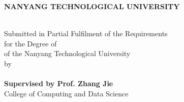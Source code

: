 \makeatletter
\begin{titlepage}
\begin{center}

\uppercase{\textbf{\large{Nanyang Technological University}}}
\\[5cm] %

\uppercase{\textbf{\fypcode \\[0.3cm]\@title}}

\vfill

Submitted in Partial Fulfilment of the Requirements\\
for the Degree of \degree\\
of the Nanyang Technological University
\\[0.8cm]
by
\\[0.8cm]

{\large \@author}
\\[1cm] %

{\large \textbf{Supervised by Prof. Zhang Jie}} %
\\[2cm]

College of Computing and Data Science\\
\@date

\end{center}
\end{titlepage}
\makeatother